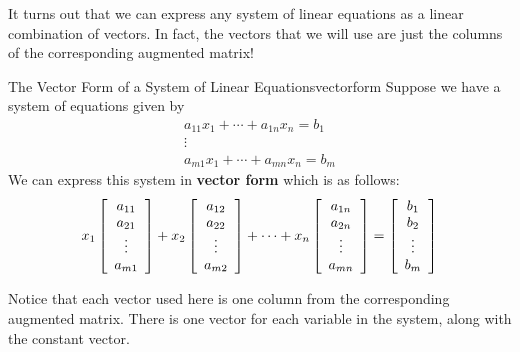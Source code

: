 It turns out that we can express any system of linear equations as a linear combination of vectors. In fact,
the vectors that we will use are just the columns of the corresponding augmented matrix! 

\begin{definition}{The Vector Form of a System of Linear Equations}{vectorform}
Suppose we have a system of equations given by
\begin{equation*}
\begin{array}{c}
a_{11}x_{1}+\cdots +a_{1n}x_{n}=b_{1} \\
\vdots \\
a_{m1}x_{1}+\cdots +a_{mn}x_{n}=b_{m}
\end{array}
\end{equation*}
We can express this system in \textbf{vector form}  which is as follows:
\begin{equation*}
x_1
\left[
\begin{array}{c}
a_{11}\\
a_{21}\\
\vdots \\
a_{m1}
\end{array}
\right]
+
x_2
\left[
\begin{array}{c}
a_{12}\\
a_{22}\\
\vdots \\
a_{m2}
\end{array}
\right]
+
\cdots
+
x_n
\left[
\begin{array}{c}
a_{1n}\\
a_{2n}\\
\vdots \\
a_{mn}
\end{array}
\right]
=
\left[
\begin{array}{c}
b_1\\
b_2\\
\vdots \\
b_m
\end{array}
\right]
\end{equation*}
\end{definition}

Notice that each vector used here is one column from the corresponding augmented  matrix. There is one vector for each variable in the system,
along with the constant vector. 

